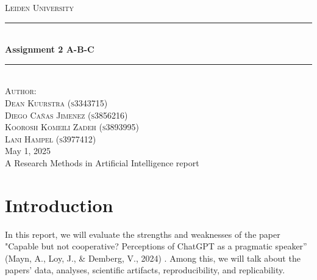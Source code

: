 \documentclass[12pt]{article}
\begin{document}

\begin{titlepage}

\newcommand{\HRule}{\rule{\linewidth}{0.5mm}}

\center
\begin{figure}[H]  \end{figure}
\textsc{\LARGE Leiden University}\\[1.5cm]


\HRule \\[0.9cm]
{ \huge \bfseries Assignment 2 A-B-C}\\[0.1cm] %
\HRule \\[1.5cm]

\textsc{Author:}\\[0.3cm]
\textsc{\Large Dean Kuurstra (s3343715)}\\[0.5cm]
\textsc{\Large Diego Cañas Jimenez (s3856216)}\\[0.5cm]
\textsc{\Large Koorosh Komeili Zadeh (s3893995)}\\[0.5cm]
\textsc{\Large Lani Hampel (s3977412)}\\[0.5cm]

\large May 1, 2025\\
A Research Methods in Artificial Intelligence report\\

\vfill %

\end{titlepage}

\newpage
\section{Introduction}
In this report, we will evaluate the strengths and weaknesses of the paper "Capable but not cooperative? Perceptions of ChatGPT as a pragmatic speaker” (Mayn, A., Loy, J., \& Demberg, V., 2024) \cite{pragmatic_gpt}. Among this, we will talk about the papers' data, analyses, scientific artifacts, reproducibility, and replicability.
\end{document}
